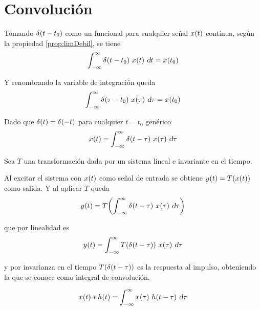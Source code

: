 \chapter{Convolución}
\label{chapter:convolucion}

Tomando $\fx[\delta]{t-t_0}$ como un funcional para cualquier señal $\fx[x]{t}$ contínua, según la propiedad \ref{prop:limDebil}, se tiene
\begin{equation*}
    \int_{-\infty}^\infty \fx[\delta]{t-t_0} \, \fx[x]{t} \, \dif t = \fx[x]{t_0}
\end{equation*}

Y renombrando la variable de integración queda
\begin{equation*}
    \int_{-\infty}^\infty \fx[\delta]{\tau-t_0} \, \fx[x]{\tau} \, \dif \tau = \fx[x]{t_0}
\end{equation*}

Dado que $\fx[\delta]{t} = \fx[\delta]{-t}$ para cualquier $t=t_0$ genérico
\begin{equation*}
    \fx[x]{t} = \int_{-\infty}^\infty \fx[\delta]{t-\tau} \, \fx[x]{\tau} \, \dif \tau
\end{equation*}

Sea $T$ una transformación dada por un sistema lineal e invariante en el tiempo.

Al excitar el sistema con $\fx[x]{t}$ como señal de entrada se obtiene $\fx[y]{t} = \fx[T]{\fx[x]{t}}$ como salida. Y al aplicar $T$ queda
\begin{equation*}
    \fx[y]{t} = \fx[T]{ \int_{-\infty}^\infty \fx[\delta]{t-\tau} \, \fx[x]{\tau} \, \dif \tau }
\end{equation*}

que por linealidad es
\begin{equation*}
    \fx[y]{t} = \int_{-\infty}^\infty \fx[T]{\fx[\delta]{t-\tau}} \, \fx[x]{\tau} \, \dif \tau
\end{equation*}

y por invarianza en el tiempo $\fx[T]{\fx[\delta]{t-\tau}}$ es la respuesta al impulso, obteniendo la que se conoce como integral de convolución.

\begin{mdframed}[style=DefinitionFrame]
    \begin{defn}
    \end{defn}
    \begin{equation*}
        \fx[x]{t} * \fx[h]{t} = \int_{-\infty}^\infty \fx[x]{\tau} \, \fx[h]{t-\tau} \, \dif \tau
    \end{equation*}
\end{mdframed}

